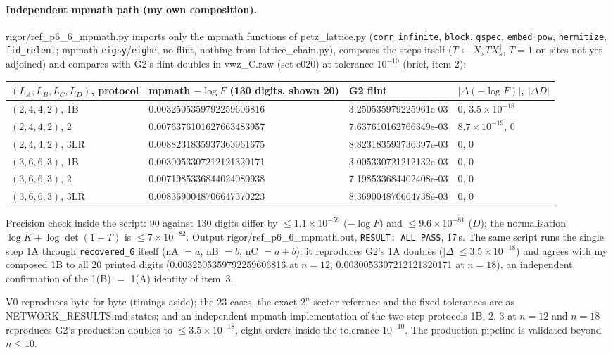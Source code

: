 \documentclass[11pt]{article}
\begin{document}
\paragraph{Independent mpmath path (my own composition).} rigor/ref\_p6\_6\_mpmath.py imports only the
mpmath functions of petz\_lattice.py (\texttt{corr\_infinite}, \texttt{block}, \texttt{gspec}, \texttt{embed\_pow},
\texttt{hermitize}, \texttt{fid\_relent}; mpmath \texttt{eigsy}/\texttt{eighe}, no flint, nothing from
lattice\_chain.py), composes the steps itself ($T\leftarrow X_sTX_s^\dagger$, $T=1$ on sites not yet adjoined) and
compares with G2's flint doubles in vwz\_C.raw (set e020) at tolerance $10^{-10}$ (brief, item 2):
\begin{center}\small
\begin{adjustbox}{max width=\textwidth}\begin{tabular}{llll}
\toprule
$(L_A,L_B,L_C,L_D)$, protocol & mpmath $-\log F$ (130 digits, shown 20) & G2 flint & $|\Delta(-\log F)|$, $|\Delta D|$\\
\midrule
$(2,4,4,2)$, 1B & 0.0032505359792259606816 & 3.250535979225961e-03 & 0, $3.5\times10^{-18}$\\
$(2,4,4,2)$, 2 & 0.0076376101627663483957 & 7.637610162766349e-03 & $8.7\times10^{-19}$, 0\\
$(2,4,4,2)$, 3LR & 0.0088231835937363961675 & 8.823183593736397e-03 & 0, 0\\
$(3,6,6,3)$, 1B & 0.0030053307212121320171 & 3.005330721212132e-03 & 0, 0\\
$(3,6,6,3)$, 2 & 0.0071985336844024080938 & 7.198533684402408e-03 & 0, 0\\
$(3,6,6,3)$, 3LR & 0.0083690048706647370223 & 8.369004870664738e-03 & 0, 0\\
\bottomrule
\end{tabular}\end{adjustbox}
\end{center}
Precision check inside the script: 90 against 130 digits differ by $\le1.1\times10^{-59}$ ($-\log F$) and
$\le9.6\times10^{-81}$ ($D$); the normalisation $\log K+\log\det(1+T)$ is $\le7\times10^{-82}$. Output
rigor/ref\_p6\_6\_mpmath.out, \texttt{RESULT: ALL PASS}, 17\,s. The same script runs the single step 1A through \texttt{recovered\_G} itself (nA $=a$, nB $=b$, nC $=a+b$): it reproduces G2's 1A doubles ($|\Delta|\le3.5\times10^{-18}$) and agrees with my composed 1B to all 20 printed digits (0.0032505359792259606816 at $n=12$, 0.0030053307212121320171 at $n=18$), an independent confirmation of the 1(B) $=$ 1(A) identity of item~3.
\begin{verdictok}
V0 reproduces byte for byte (timings aside); the 23 cases, the exact $2^n$ sector reference and the fixed
tolerances are as NETWORK\_RESULTS.md states; and an independent mpmath implementation of the two-step protocols
1B, 2, 3 at $n=12$ and $n=18$ reproduces G2's production doubles to $\le3.5\times10^{-18}$, eight orders inside the
tolerance $10^{-10}$. The production pipeline is validated beyond $n\le10$.
\end{verdictok}
\end{document}
